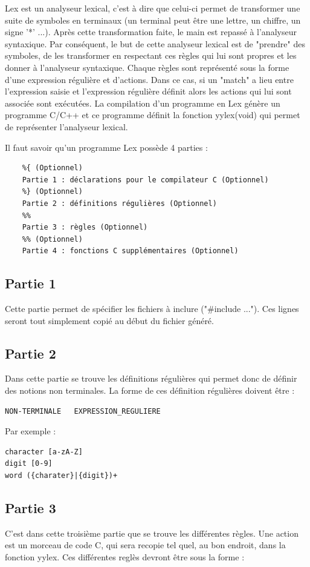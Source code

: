 Lex est un analyseur lexical, c'est à dire que celui-ci permet de transformer une suite de symboles en terminaux (un terminal peut être une lettre, un chiffre, un signe '*' ...). Après cette transformation faite, le main est repassé à l'analyseur syntaxique. Par conséquent, le but de cette analyseur lexical est de "prendre" des symboles, de les transformer en respectant ces règles qui lui sont propres et les donner à l'analyseur syntaxique. Chaque règles sont représenté sous la forme d'une expression régulière et d'actions. Dans ce cas, si un "match" a lieu entre l'expression saisie et l'expression régulière définit alors les actions qui lui sont associée sont exécutées.
La compilation d'un programme en Lex génère un programme C/C++ et ce programme définit la fonction yylex(void) qui permet de représenter l'analyseur lexical.

Il faut savoir qu'un programme Lex possède 4 parties :
\begin{verbatim}
    %{ (Optionnel)
    Partie 1 : déclarations pour le compilateur C (Optionnel)
    %} (Optionnel)
    Partie 2 : définitions régulières (Optionnel)
    %%
    Partie 3 : règles (Optionnel)
    %% (Optionnel)
    Partie 4 : fonctions C supplémentaires (Optionnel)
\end{verbatim}

\subsection{Partie 1}
Cette partie permet de spécifier les fichiers à inclure ("\#include ..."). Ces lignes seront tout simplement copié au début du fichier généré.

\subsection{Partie 2}
Dans cette partie se trouve les définitions régulières qui permet donc de définir des notions non terminales. La forme de ces définition régulières doivent être :
\begin{verbatim}
NON-TERMINALE   EXPRESSION_REGULIERE
\end{verbatim}

Par exemple :

\begin{verbatim}
character [a-zA-Z]
digit [0-9]
word ({charater}|{digit})+
\end{verbatim}

\subsection{Partie 3}
C'est dans cette troisième partie que se trouve les différentes règles. Une action est un morceau de code C, qui sera recopie tel quel, au bon endroit, dans la fonction yylex. Ces différentes reglès devront être sous la forme : 

